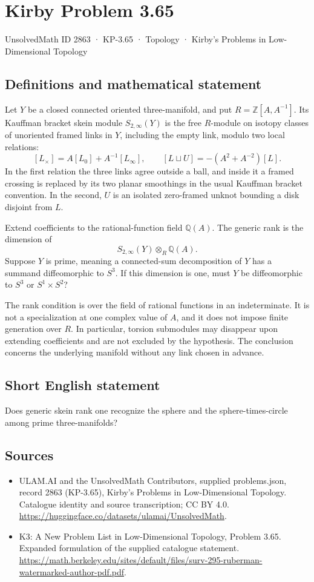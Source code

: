 \documentclass[11pt,a4paper]{article}
\begin{document}
\section*{Kirby Problem 3.65}\label{2863}
{\small UnsolvedMath ID 2863 · KP-3.65 · Topology · Kirby's Problems in Low-Dimensional Topology}
\subsection{Definitions and mathematical statement}
Let $Y$ be a closed connected oriented three-manifold, and put $R=\mathbb Z[A,A^{-1}]$. Its Kauffman bracket skein module $S_{2,\infty}(Y)$ is the free $R$-module on isotopy classes of unoriented framed links in $Y$, including the empty link, modulo two local relations:
\[
[L_\times]=A[L_0]+A^{-1}[L_\infty],\qquad
[L\sqcup U]=-(A^2+A^{-2})[L].
\]
In the first relation the three links agree outside a ball, and inside it a framed crossing is replaced by its two planar smoothings in the usual Kauffman bracket convention. In the second, $U$ is an isolated zero-framed unknot bounding a disk disjoint from $L$.

Extend coefficients to the rational-function field $\mathbb Q(A)$. The generic rank is the dimension of
\[
S_{2,\infty}(Y)\otimes_R\mathbb Q(A).
\]
Suppose $Y$ is prime, meaning a connected-sum decomposition of $Y$ has a summand diffeomorphic to $S^3$. If this dimension is one, must $Y$ be diffeomorphic to $S^3$ or $S^1\times S^2$?

The rank condition is over the field of rational functions in an indeterminate. It is not a specialization at one complex value of $A$, and it does not impose finite generation over $R$. In particular, torsion submodules may disappear upon extending coefficients and are not excluded by the hypothesis. The conclusion concerns the underlying manifold without any link chosen in advance.
\subsection{Short English statement}
Does generic skein rank one recognize the sphere and the sphere-times-circle among prime three-manifolds?
\subsection{Sources}
\begin{itemize}
\item[S1] ULAM.AI and the UnsolvedMath Contributors, supplied problems.json, record 2863 (KP-3.65), Kirby's Problems in Low-Dimensional Topology. Catalogue identity and source transcription; CC BY 4.0.
\url{https://huggingface.co/datasets/ulamai/UnsolvedMath}.
\item[S2] K3: A New Problem List in Low-Dimensional Topology, Problem 3.65. Expanded formulation of the supplied catalogue statement.
\url{https://math.berkeley.edu/sites/default/files/surv-295-ruberman-watermarked-author-pdf.pdf}.
\end{itemize}
\end{document}
